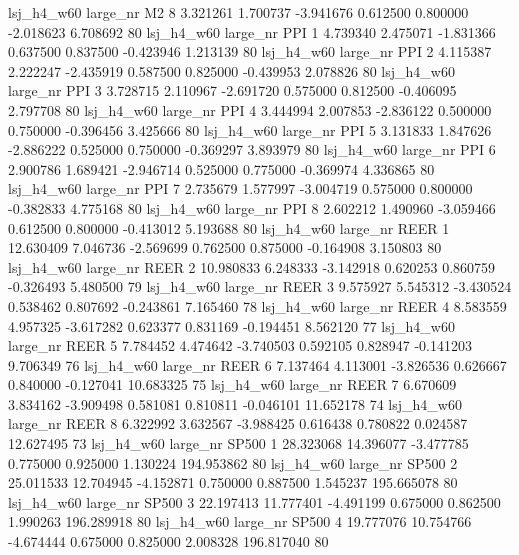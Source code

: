   lsj_h4_w60   large_nr       M2                 8  3.321261  1.700737  -3.941676 0.612500 0.800000 -2.018623    6.708692 80
  lsj_h4_w60   large_nr      PPI                 1  4.739340  2.475071  -1.831366 0.637500 0.837500 -0.423946    1.213139 80
  lsj_h4_w60   large_nr      PPI                 2  4.115387  2.222247  -2.435919 0.587500 0.825000 -0.439953    2.078826 80
  lsj_h4_w60   large_nr      PPI                 3  3.728715  2.110967  -2.691720 0.575000 0.812500 -0.406095    2.797708 80
  lsj_h4_w60   large_nr      PPI                 4  3.444994  2.007853  -2.836122 0.500000 0.750000 -0.396456    3.425666 80
  lsj_h4_w60   large_nr      PPI                 5  3.131833  1.847626  -2.886222 0.525000 0.750000 -0.369297    3.893979 80
  lsj_h4_w60   large_nr      PPI                 6  2.900786  1.689421  -2.946714 0.525000 0.775000 -0.369974    4.336865 80
  lsj_h4_w60   large_nr      PPI                 7  2.735679  1.577997  -3.004719 0.575000 0.800000 -0.382833    4.775168 80
  lsj_h4_w60   large_nr      PPI                 8  2.602212  1.490960  -3.059466 0.612500 0.800000 -0.413012    5.193688 80
  lsj_h4_w60   large_nr     REER                 1 12.630409  7.046736  -2.569699 0.762500 0.875000 -0.164908    3.150803 80
  lsj_h4_w60   large_nr     REER                 2 10.980833  6.248333  -3.142918 0.620253 0.860759 -0.326493    5.480500 79
  lsj_h4_w60   large_nr     REER                 3  9.575927  5.545312  -3.430524 0.538462 0.807692 -0.243861    7.165460 78
  lsj_h4_w60   large_nr     REER                 4  8.583559  4.957325  -3.617282 0.623377 0.831169 -0.194451    8.562120 77
  lsj_h4_w60   large_nr     REER                 5  7.784452  4.474642  -3.740503 0.592105 0.828947 -0.141203    9.706349 76
  lsj_h4_w60   large_nr     REER                 6  7.137464  4.113001  -3.826536 0.626667 0.840000 -0.127041   10.683325 75
  lsj_h4_w60   large_nr     REER                 7  6.670609  3.834162  -3.909498 0.581081 0.810811 -0.046101   11.652178 74
  lsj_h4_w60   large_nr     REER                 8  6.322992  3.632567  -3.988425 0.616438 0.780822  0.024587   12.627495 73
  lsj_h4_w60   large_nr    SP500                 1 28.323068 14.396077  -3.477785 0.775000 0.925000  1.130224  194.953862 80
  lsj_h4_w60   large_nr    SP500                 2 25.011533 12.704945  -4.152871 0.750000 0.887500  1.545237  195.665078 80
  lsj_h4_w60   large_nr    SP500                 3 22.197413 11.777401  -4.491199 0.675000 0.862500  1.990263  196.289918 80
  lsj_h4_w60   large_nr    SP500                 4 19.777076 10.754766  -4.674444 0.675000 0.825000  2.008328  196.817040 80
